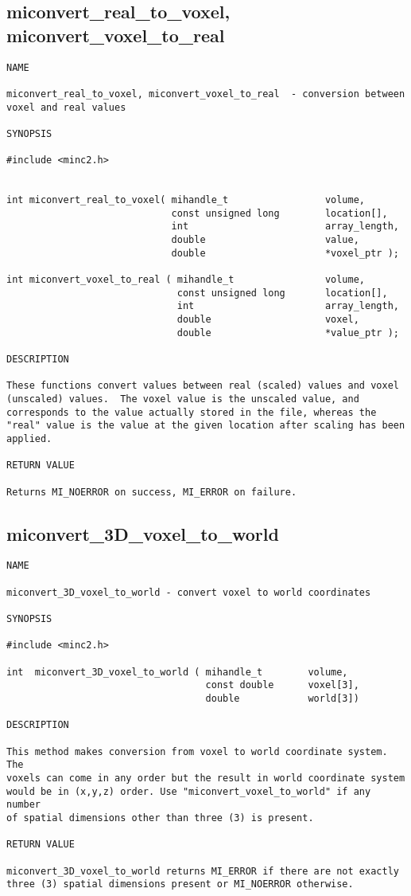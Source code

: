 \documentclass{article}
\begin{document}
\subsection{miconvert\_real\_to\_voxel, miconvert\_voxel\_to\_real}
\begin{verbatim}
NAME 

miconvert_real_to_voxel, miconvert_voxel_to_real  - conversion between
voxel and real values

SYNOPSIS

#include <minc2.h>


int miconvert_real_to_voxel( mihandle_t                 volume,
                             const unsigned long        location[],
                             int                        array_length,
                             double                     value,
                             double                     *voxel_ptr );

int miconvert_voxel_to_real ( mihandle_t                volume, 
                              const unsigned long       location[],
                              int                       array_length,
                              double                    voxel,
                              double                    *value_ptr );

DESCRIPTION

These functions convert values between real (scaled) values and voxel
(unscaled) values.  The voxel value is the unscaled value, and
corresponds to the value actually stored in the file, whereas the
"real" value is the value at the given location after scaling has been
applied.

RETURN VALUE

Returns MI_NOERROR on success, MI_ERROR on failure.
\end{verbatim}

\subsection{miconvert\_3D\_voxel\_to\_world}
\begin{verbatim}
NAME 

miconvert_3D_voxel_to_world - convert voxel to world coordinates

SYNOPSIS

#include <minc2.h>

int  miconvert_3D_voxel_to_world ( mihandle_t        volume,
                                   const double      voxel[3],
                                   double            world[3])
                                
DESCRIPTION

This method makes conversion from voxel to world coordinate system. The
voxels can come in any order but the result in world coordinate system 
would be in (x,y,z) order. Use "miconvert_voxel_to_world" if any number
of spatial dimensions other than three (3) is present.

RETURN VALUE

miconvert_3D_voxel_to_world returns MI_ERROR if there are not exactly
three (3) spatial dimensions present or MI_NOERROR otherwise.
\end{verbatim}
\end{document}
